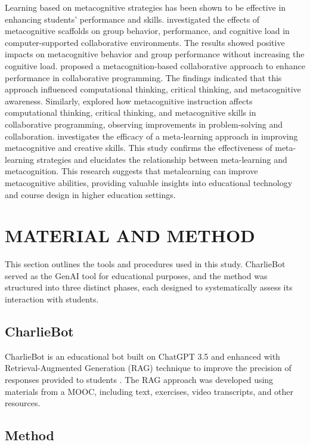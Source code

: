 \documentclass[a4paper,twoside]{article}
\begin{document}
Learning based on metacognitive strategies has been shown to be effective in
enhancing students’ performance and skills. \cite{Zheng19} investigated the
effects of metacognitive scaffolds on group behavior, performance, and cognitive
load in computer-supported collaborative environments. The results showed
positive impacts on metacognitive behavior and group performance without
increasing the cognitive load. \cite{LiWei23} proposed a metacognition-based
collaborative approach to enhance performance in collaborative programming. The
findings indicated that this approach influenced computational thinking,
critical thinking, and metacognitive awareness. Similarly, \cite{Wang23}
explored how metacognitive instruction affects computational thinking, critical
thinking, and metacognitive skills in collaborative programming, observing
improvements in problem-solving and collaboration. \cite{Khusnul24} investigates
the efficacy of a meta-learning approach in improving metacognitive and creative
skills. This study confirms the effectiveness of meta-learning strategies and
elucidates the relationship between meta-learning and metacognition. This
research suggests that metalearning can improve metacognitive abilities,
providing valuable insights into educational technology and course design in
higher education settings.

\section{\uppercase{Material and Method}}

This section outlines the tools and procedures used in this study. CharlieBot
served as the GenAI tool for educational purposes, and the method was structured
into three distinct phases, each designed to systematically assess its
interaction with students.

\subsection{CharlieBot}

CharlieBot is an educational bot built on ChatGPT 3.5 and enhanced with
Retrieval-Augmented Generation (RAG) technique to improve the precision of
responses provided to students \cite{Sun24}. The RAG approach was developed
using materials from a MOOC, including text, exercises, video transcripts, and
other resources.

\subsection{Method}
\end{document}
